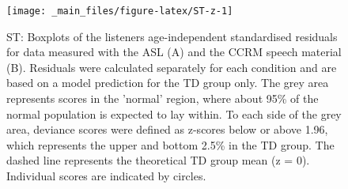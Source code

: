 \documentclass[a4paper, twoside]{templates/ociamthesis}
\begin{document}
\begin{figure}

{\centering \texttt{[image: \_main\_files/figure-latex/ST-z-1]} 

}

\caption{ST: Boxplots of the listeners age-independent standardised residuals for data measured with the ASL (A) and the CCRM speech material (B). Residuals were calculated separately for each condition and are based on a model prediction for the TD group only. The grey area represents scores in the 'normal' region, where about 95\% of the normal population is expected to lay within. To each side of the grey area, deviance scores were defined as z-scores below or above 1.96, which represents the upper and bottom 2.5\% in the TD group. The dashed line represents the theoretical TD group mean (z = 0). Individual scores are indicated by circles.}\label{fig:ST-z}
\end{figure}
\end{document}
